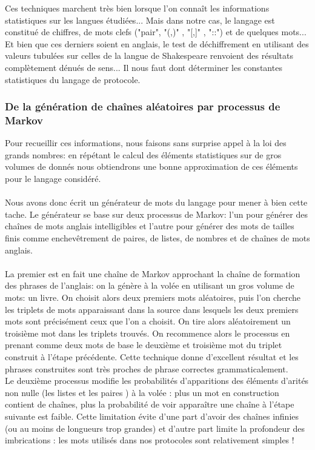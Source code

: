 \documentclass[11pt]{article} %
\begin{document}
    Ces techniques marchent très bien lorsque l'on connaît les informations statistiques sur les langues étudiées... Mais dans notre cas, le langage est constitué de chiffres, de mots clefs ("pair", "(,)" , "[,]" , "::") et de quelques mots... Et bien que ces derniers soient en anglais, le test de déchiffrement en utilisant des valeurs tubulées sur celles de la langue de Shakespeare renvoient des résultats complètement dénués de sens... Il nous faut dont déterminer les constantes statistiques du langage de protocole.

\subsubsection{De la génération de chaînes aléatoires par processus de Markov}

    Pour recueillir ces informations, nous faisons sans surprise appel à la loi des grands nombres: en répétant le calcul des éléments statistiques sur de gros volumes de donnés nous obtiendrons une bonne approximation de ces éléments pour le langage considéré. \\\\

     Nous avons donc écrit un générateur de mots du langage pour mener à bien cette tache. Le générateur se base sur deux processus de Markov: l'un pour générer des chaînes de mots anglais intelligibles et l'autre pour générer des mots de tailles finis comme enchevêtrement de paires, de listes, de nombres et de chaînes de mots anglais. \\\\

    La premier est en fait une chaîne de Markov approchant la chaîne de formation des phrases de l'anglais: on la génère à la volée en utilisant un gros volume de mots: un livre. On choisit alors deux premiers mots aléatoires, puis l'on cherche les triplets de mots apparaissant dans la source dans lesquels les deux premiers mots sont précisément ceux que l'on a choisit. On tire alors aléatoirement un troisième mot dans les triplets trouvés. On recommence alors le processus en prenant comme deux mots de base le deuxième et troisième mot du triplet construit à l'étape précédente. Cette technique donne d'excellent résultat et les phrases construites sont très proches de phrase correctes grammaticalement. \\

    Le deuxième processus modifie les probabilités d'apparitions des éléments d'arités non nulle (les listes et les paires ) à la volée : plus un mot en construction contient de chaînes, plus la probabilité de voir apparaître une chaîne à l'étape suivante est faible.  Cette limitation évite d'une part d'avoir des chaînes infinies (ou au moins de longueurs trop grandes) et d'autre part limite la profondeur des imbrications : les mots utilisés dans nos protocoles sont relativement simples !
\end{document}
